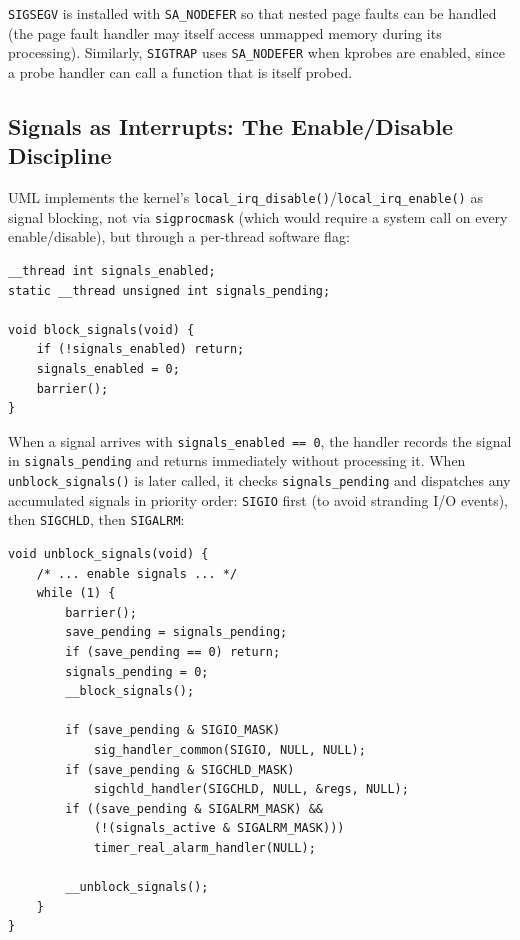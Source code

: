 \texttt{SIGSEGV} is installed with \texttt{SA\_NODEFER} so that nested
page faults can be handled (the page fault handler may itself access
unmapped memory during its processing).  Similarly, \texttt{SIGTRAP} uses
\texttt{SA\_NODEFER} when kprobes are enabled, since a probe handler can call
a function that is itself probed.

\subsection{Signals as Interrupts: The Enable/Disable Discipline}
\label{sec:impl-signal-discipline}

UML implements the kernel's \texttt{local\_irq\_disable()}/\texttt{local\_irq\_enable()} as signal blocking, not via
\texttt{sigprocmask} (which would require a system call on every
enable/disable), but through a per-thread software flag:

\begin{lstlisting}[language=KernelC,caption={Software-based IRQ disable},label=lst:signals-enabled]
__thread int signals_enabled;
static __thread unsigned int signals_pending;

void block_signals(void) {
    if (!signals_enabled) return;
    signals_enabled = 0;
    barrier();
}
\end{lstlisting}

When a signal arrives with \texttt{signals\_enabled == 0}, the handler records
the signal in \texttt{signals\_pending} and returns immediately without
processing it.  When \texttt{unblock\_signals()} is later called, it checks
\texttt{signals\_pending} and dispatches any accumulated signals in priority
order: \texttt{SIGIO} first (to avoid stranding I/O events), then
\texttt{SIGCHLD}, then \texttt{SIGALRM}:

\begin{lstlisting}[language=KernelC,caption={Deferred signal dispatch in \texttt{unblock\_signals()}},label=lst:unblock-dispatch]
void unblock_signals(void) {
    /* ... enable signals ... */
    while (1) {
        barrier();
        save_pending = signals_pending;
        if (save_pending == 0) return;
        signals_pending = 0;
        __block_signals();

        if (save_pending & SIGIO_MASK)
            sig_handler_common(SIGIO, NULL, NULL);
        if (save_pending & SIGCHLD_MASK)
            sigchld_handler(SIGCHLD, NULL, &regs, NULL);
        if ((save_pending & SIGALRM_MASK) &&
            (!(signals_active & SIGALRM_MASK)))
            timer_real_alarm_handler(NULL);

        __unblock_signals();
    }
}
\end{lstlisting}

